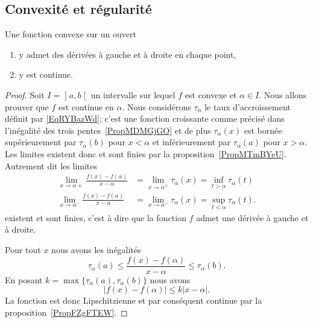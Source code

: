\subsection{Convexité et régularité}

\begin{lemma}   \label{LemKLTsHIQ}
    Une fonction convexe sur un ouvert
    \begin{enumerate}
        \item
            y admet des dérivées à gauche et à droite en chaque point,
        \item
            y est continue.
    \end{enumerate}
\end{lemma}

\begin{proof}
    Soit \( I=\mathopen] a , b \mathclose[\) un intervalle sur lequel \( f\) est convexe et \( \alpha\in I\). Nous allons prouver que \( f\) est continue en \( \alpha\). Nous considérons \( \tau_{\alpha}\) le taux d'accroissement définit par \eqref{EqRYBazWd}; c'est une fonction croissante comme précisé dans l'inégalité des trois pentes~\ref{PropMDMGjGO} et de plus \( \tau_{\alpha}(x)\) est bornée supérieurement par \( \tau_{\alpha}(b)\) pour \( x<\alpha\) et inférieurement par \( \tau_{\alpha}(a)\) pour \( x>\alpha\). Les limites existent donc et sont finies par la proposition~\ref{PropMTmBYeU}. Autrement dit les limites
        \begin{subequations}
            \begin{align}
                \lim_{x\to \alpha+} \frac{ f(x)-f(\alpha) }{ x-\alpha }&=\lim_{x\to \alpha^+} \tau_{\alpha}(x)=\inf_{t>\alpha}\tau_{\alpha}(t)\\
                \lim_{x\to \alpha^-} \frac{ f(x)-f(\alpha) }{ x-\alpha }&=\lim_{x\to \alpha^-} \tau_{\alpha}(x)=\sup_{t<\alpha}\tau_{\alpha}(t).
            \end{align}
        \end{subequations}
        existent et sont finies, c'est à dire que la fonction \( f\) admet une dérivée à gauche et à droite.

        Pour tout \( x\) nous avons les inégalités
        \begin{equation}
            \tau_{\alpha}(a)\leq \frac{ f(x)-f(\alpha) }{ x-\alpha }\leq \tau_{\alpha}(b).
        \end{equation}
        En posant \( k=\max\{ \tau_{\alpha}(a),\tau_{\alpha}(b) \}\) nous avons
        \begin{equation}
            \big| f(x)-f(\alpha) \big|\leq k| x-\alpha |.
        \end{equation}
        La fonction est donc Lipschitzienne et par conséquent continue par la proposition~\ref{PropFZgFTEW}.
\end{proof}

